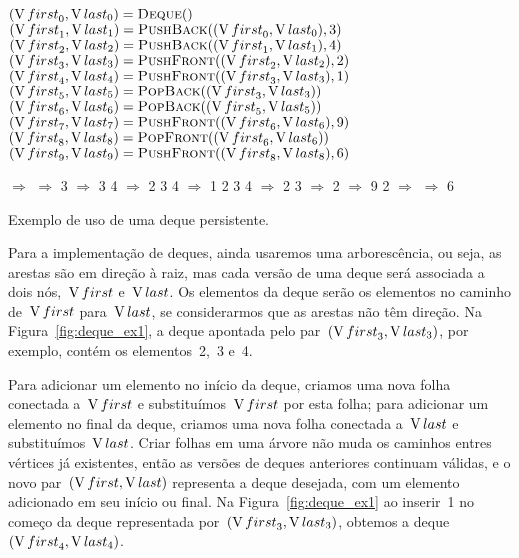 \documentclass[main.tex]{subfiles}
\begin{document}
\begin{example}[t]
\centering

\begin{subalgorithm}{0.55\textwidth}
\begin{algorithmic}

\State $(\V{first}_0, \V{last}_0) = \Call{Deque}{\null}$
\State $(\V{first}_1, \V{last}_1) = \Call{PushBack}{(\V{first}_0,\V{last}_0), 3}$
\State $(\V{first}_2, \V{last}_2) = \Call{PushBack}{(\V{first}_1,\V{last}_1), 4}$
\State $(\V{first}_3, \V{last}_3) = \Call{PushFront}{(\V{first}_2,\V{last}_2), 2}$
\State $(\V{first}_4, \V{last}_4) = \Call{PushFront}{(\V{first}_3,\V{last}_3), 1}$
\State $(\V{first}_5, \V{last}_5) = \Call{PopBack}{(\V{first}_3,\V{last}_3)}$
\State $(\V{first}_6, \V{last}_6) = \Call{PopBack}{(\V{first}_5,\V{last}_5)}$
\State $(\V{first}_7, \V{last}_7) = \Call{PushFront}{(\V{first}_6,\V{last}_6), 9}$
\State $(\V{first}_8, \V{last}_8) = \Call{PopFront}{(\V{first}_6,\V{last}_6)}$
\State $(\V{first}_9, \V{last}_9) = \Call{PushFront}{(\V{first}_8,\V{last}_8), 6}$

\end{algorithmic}
\end{subalgorithm} \vrule
\begin{subalgorithm}{0.4\textwidth}
\begin{algorithmic}

\State $\Rightarrow$
\State $\Rightarrow$ 3
\State $\Rightarrow$ 3 4
\State $\Rightarrow$ 2 3 4
\State $\Rightarrow$ 1 2 3 4
\State $\Rightarrow$ 2 3
\State $\Rightarrow$ 2
\State $\Rightarrow$ 9 2
\State $\Rightarrow$
\State $\Rightarrow$ 6

\end{algorithmic}
\end{subalgorithm}
\caption{Exemplo de uso de uma deque persistente.} \label{ex:deque}
\end{example}

Para a implementação de deques, ainda usaremos uma arborescência, ou seja, as arestas são em direção à raiz, mas cada versão de uma deque será associada a dois nós,~$\operatorname{V}{first}$ e~$\operatorname{V}{last}$. Os elementos da deque serão os elementos no caminho de~$\operatorname{V}{first}$ para~$\operatorname{V}{last}$, se considerarmos que as arestas não têm direção. Na Figura~\ref{fig:deque_ex1}, a deque apontada pelo par~$(\operatorname{V}{first}_3, \operatorname{V}{last}_3)$, por exemplo, contém os elementos~2,~3 e~4.

Para adicionar um elemento no início da deque, criamos uma nova folha conectada a~$\operatorname{V}{first}$ e substituímos~$\operatorname{V}{first}$ por esta folha; para adicionar um elemento no final da deque, criamos uma nova folha conectada a~$\operatorname{V}{last}$ e substituímos~$\operatorname{V}{last}$. Criar folhas em uma árvore não muda os caminhos entres vértices já existentes, então as versões de deques anteriores continuam válidas, e o novo par~$(\operatorname{V}{first}, \operatorname{V}{last})$ representa a deque desejada, com um elemento adicionado em seu início ou final. Na Figura~\ref{fig:deque_ex1} ao inserir~1 no começo da deque representada por~$(\operatorname{V}{first}_3, \operatorname{V}{last_3})$, obtemos a deque~$(\operatorname{V}{first}_4, \operatorname{V}{last}_4)$.
\end{document}
